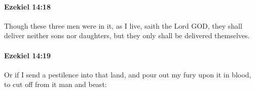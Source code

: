 		\paragraph{Ezekiel 14:18} %
			\label{EZEKIEL-14-18}

			Though these three men were in it, as I live, saith the Lord GOD, they shall deliver neither sons nor daughters, but they only shall be delivered themselves.


		\paragraph{Ezekiel 14:19} %
			\label{EZEKIEL-14-19}

			Or if I send a pestilence into that land, and pour out my fury upon it in blood, to cut off from it man and beast:


